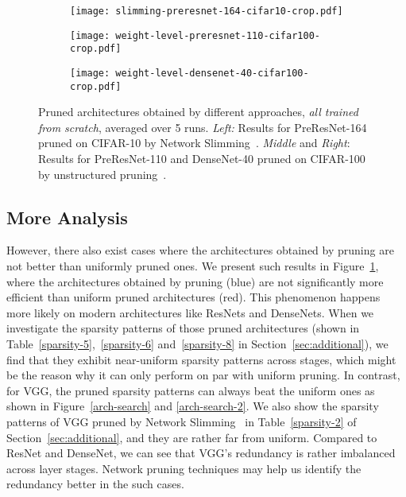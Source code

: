 \begin{figure}[!htbp]
\centering
\begin{minipage}{.325\textwidth}
 \begin{subfigure}{\textwidth}
 \centering
 \texttt{[image: slimming-preresnet-164-cifar10-crop.pdf]}
 \end{subfigure}
\end{minipage}
\begin{minipage}{.325\textwidth}
 \begin{subfigure}{\textwidth}
 \centering
\texttt{[image: weight-level-preresnet-110-cifar100-crop.pdf]}
 \end{subfigure}
\end{minipage}
\begin{minipage}{.325\textwidth}
 \begin{subfigure}{\textwidth}
 \centering
\texttt{[image: weight-level-densenet-40-cifar100-crop.pdf]}
 \end{subfigure}
\end{minipage}
    \caption{
      Pruned architectures obtained by different approaches, \emph{all trained from scratch}, averaged over 5 runs. \emph{Left:} Results for PreResNet-164 pruned on CIFAR-10 by Network Slimming~\cite{liu2017learning}. \emph{Middle} and \emph{Right}: Results for PreResNet-110 and DenseNet-40 pruned on CIFAR-100 by unstructured pruning~\cite{han2015learning}. 
    }
    \label{arch-search-negative}
\end{figure}

\subsection{More Analysis} 
However, there also exist cases where the architectures obtained by pruning are not better than uniformly pruned ones.
We present such results in 
Figure~\ref{arch-search-negative}, where the architectures obtained by pruning (blue) are not significantly more efficient than uniform pruned architectures (red). This phenomenon happens more likely on modern architectures like ResNets and DenseNets. When we investigate the sparsity patterns of those pruned architectures (shown in Table~\ref{sparsity-5},~\ref{sparsity-6} and~\ref{sparsity-8} in Section~\ref{sec:additional}), we find that they exhibit near-uniform sparsity patterns across stages, which might be the reason why it can only perform on par with uniform pruning. In contrast, for VGG, the pruned sparsity patterns can always beat the uniform ones as shown in Figure~\ref{arch-search} and \ref{arch-search-2}. We also show the sparsity patterns of VGG pruned by Network Slimming~\cite{liu2017learning} in Table~\ref{sparsity-2} of Section~\ref{sec:additional}, and they are rather far from uniform. Compared to ResNet and DenseNet, we can see that VGG's redundancy is rather imbalanced across layer stages. Network pruning techniques may help us identify the redundancy better in the such cases.

